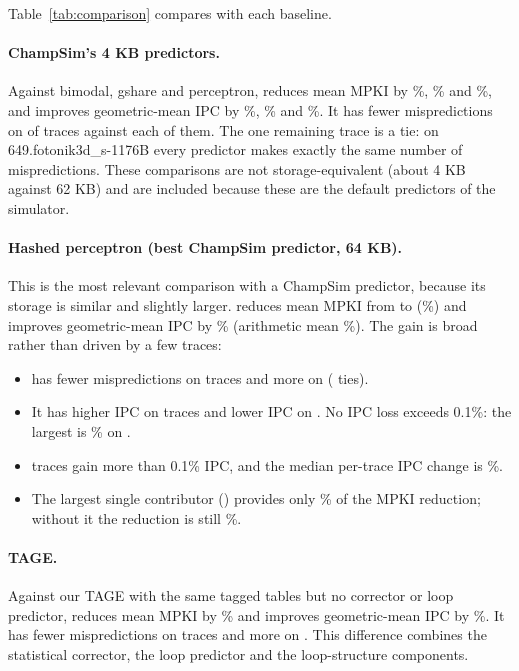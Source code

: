 Table~\ref{tab:comparison} compares \prop{} with each baseline.

\paragraph{ChampSim's 4 KB predictors.} Against bimodal, gshare and perceptron, \prop{} reduces mean MPKI by \%, \% and \%, and improves geometric-mean IPC by \%, \% and \%. It has fewer mispredictions on  of  traces against each of them. The one remaining trace is a tie: on 649.fotonik3d\_s-1176B every predictor makes exactly the same number of mispredictions. These comparisons are not storage-equivalent (about 4 KB against 62 KB) and are included because these are the default predictors of the simulator.

\paragraph{Hashed perceptron (best ChampSim predictor, 64 KB).} This is the most relevant comparison with a ChampSim predictor, because its storage is similar and slightly larger. \prop{} reduces mean MPKI from  to  (\%) and improves geometric-mean IPC by \% (arithmetic mean \%). The gain is broad rather than driven by a few traces:
\begin{itemize}
\item \prop{} has fewer mispredictions on  traces and more on  ( ties).
\item It has higher IPC on  traces and lower IPC on . No IPC loss exceeds 0.1\%: the largest is \% on .
\item {} traces gain more than 0.1\% IPC, and the median per-trace IPC change is \%.
\item The largest single contributor () provides only \% of the MPKI reduction; without it the reduction is still \%.
\end{itemize}

\paragraph{TAGE.} Against our TAGE with the same tagged tables but no corrector or loop predictor, \prop{} reduces mean MPKI by \% and improves geometric-mean IPC by \%. It has fewer mispredictions on  traces and more on . This difference combines the statistical corrector, the loop predictor and the loop-structure components.

